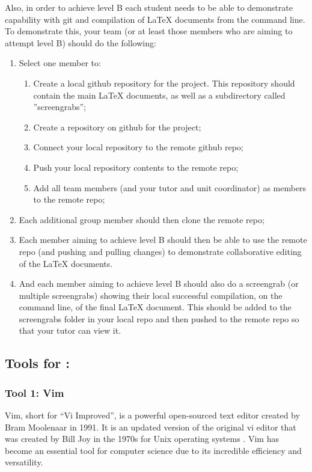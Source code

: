 \documentclass[a4paper, 11pt]{report}
\begin{document}
Also, in order to achieve level B each student needs to be able to demonstrate capability with git and compilation of LaTeX documents from the command line. To demonstrate this, your team (or at least those members who are aiming to attempt level B) should do the following:
\begin{enumerate}
	\item Select one member to:
	\begin{enumerate}
		\item Create a local github repository for the project. This repository should contain the main LaTeX documents, as well as a subdirectory called ''screengrabs'';
		\item Create a repository on github for the project;
		\item Connect your local repository to the remote github repo;
		\item Push your local repository contents to the remote repo;
		\item Add all team members (and your tutor and unit coordinator) as members to the remote repo;
	\end{enumerate}
	\item Each additional group member should then clone the remote repo;
	\item Each member aiming to achieve level B should then be able to use the remote repo (and pushing and pulling changes) to demonstrate collaborative editing of the LaTeX documents.
	\item And each member aiming to achieve level B should also do a screengrab (or multiple screengrabs) showing their local successful compilation, on the command line, of the final LaTeX document. This should be added to the screengrabs folder in your local repo and then pushed to the remote repo so that your tutor can view it.
\end{enumerate}

\subsection{Tools for \majA: \studA}

\subsubsection{Tool 1: Vim}

Vim, short for “Vi Improved”, is a powerful open-sourced text editor created by Bram Moolenaar in 1991. It is an updated version of the original vi editor that was created by Bill Joy in the 1970s for Unix operating systems \cite{vim}. Vim has become an essential tool for computer science due to its incredible efficiency and versatility.
\end{document}

